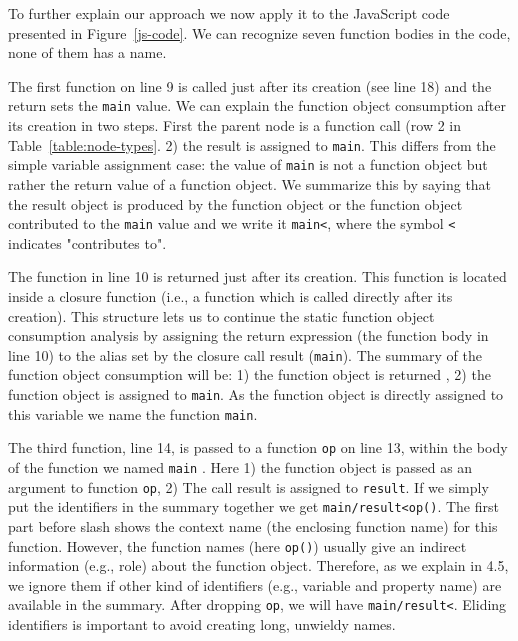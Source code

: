 \documentclass[10pt, preprint]{sigplanconf}
\begin{document}
{To further explain our approach we now apply it to the JavaScript code presented in Figure~\ref{js-code}. We can recognize seven function bodies in the code, none of them has a name. 

The first function on line 9 is called just after its creation (see line 18) and the return sets the {\small\texttt{main}} value. We can explain the function object consumption after its creation in two steps. First the parent node is a function call (row 2 in Table~\ref{table:node-types}. 2) the result is assigned to {\small\texttt{main}}. This differs from the simple variable assignment case: the value of {\small\texttt{main}} is not a function object but rather the return value of a function object.   We summarize this by saying that the result object is produced by the function object or the function object contributed to the {\small\texttt{main}} value and we write it {\small\texttt{main<}}, where the symbol {\small\texttt{<}} indicates "contributes to".

The function in line 10 is returned just after its creation. This function is located inside a closure function (i.e., a function which is called directly after its creation). This structure lets us to continue the static function object consumption analysis by assigning the return expression (the function body in line 10) to the alias set by the closure call result ({\small\texttt{main}}). The summary of the function object consumption will be: 1) the function object is returned , 2) the function object is assigned to {\small\texttt{main}}. As the function object is directly assigned to this variable we name the function {\small\texttt{main}}.

The third function, line 14, is passed to a function {\small\texttt{op}} on line 13, within the body of the function we named {\small\texttt{main}} . Here 1) the function object is passed as an argument to function {\small\texttt{op}}, 2) The call result is assigned to {\small\texttt{result}}. If we simply put the identifiers in the summary together we get {\small\texttt{main/result<op()}}. The first part before slash  shows the context name (the enclosing function name) for this function.  However, the function names (here {\small\texttt{op()}}) usually give an indirect information (e.g., role) about the function object. Therefore, as we explain in 4.5, we ignore them if other kind of identifiers (e.g., variable and property name) are available in the summary. After dropping {\small\texttt{op}}, we will have {\small\texttt{main/result<}}. Eliding identifiers is important to avoid creating long, unwieldy names.

}
\end{document}
